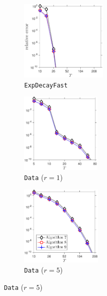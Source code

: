 \documentclass[final]{siamart1116}
\numberwithin{equation}{section}
\numberwithin{theorem}{section}
\numberwithin{figure}{section}
\begin{document}
\begin{figure}[htp!]
\begin{center}
\begin{subfigure}{.325\textwidth}
\begin{center}
\includegraphics[height=1.5in]{figures/EFAST_Alg789.pdf}
\caption{\texttt{ExpDecayFast}}
\label{fig:EFAST-789}
\end{center}
\end{subfigure}
\begin{subfigure}{.325\textwidth}
\begin{center}
\includegraphics[height=1.5in]{figures/DATA1_Alg789.pdf}
\caption{\texttt{Data} ($r = 1$)}
\label{fig:DATA1-789}
\end{center}
\end{subfigure}
\begin{subfigure}{.325\textwidth}
\begin{center}
\includegraphics[height=1.5in]{figures/DATA5_Alg789.pdf}
\caption{\texttt{Data} ($r = 5$)}
\label{fig:DATA5-789}
\end{center}
\end{subfigure}
\end{center}

\vspace{0.5em}


\end{figure}
\end{document}
